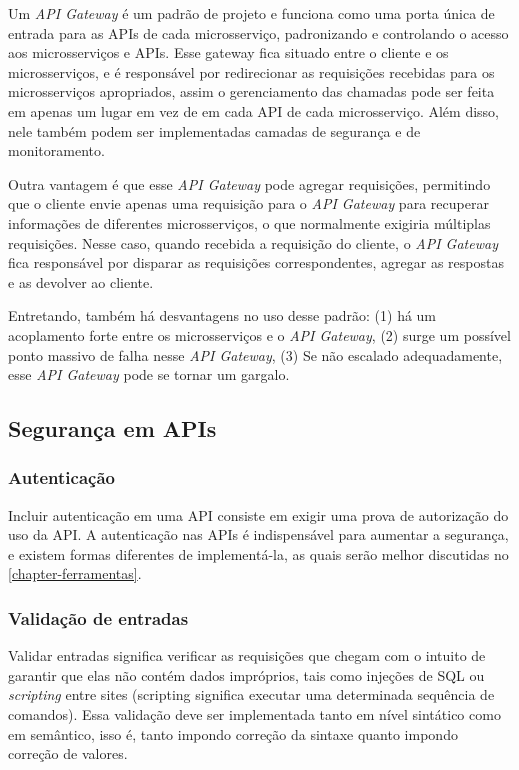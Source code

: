 Um \emph{API Gateway} é um padrão de projeto e funciona como uma porta única de entrada para as APIs de cada microsserviço, padronizando e controlando o acesso aos microsserviços e APIs. Esse gateway fica situado entre o cliente e os microsserviços, e é responsável por redirecionar as requisições recebidas para os microsserviços apropriados, assim o gerenciamento das chamadas pode ser feita em apenas um lugar em vez de em cada API de cada microsserviço. Além disso, nele também podem ser implementadas camadas de segurança e de monitoramento.

Outra vantagem é que esse \emph{API Gateway} pode agregar requisições, permitindo que o cliente envie apenas uma requisição para o \emph{API Gateway} para recuperar informações de diferentes microsserviços, o que normalmente exigiria múltiplas requisições. Nesse caso, quando recebida a requisição do cliente, o \emph{API Gateway} fica responsável por disparar as requisições correspondentes, agregar as respostas e as devolver ao cliente.

Entretando, também há desvantagens no uso desse padrão: (1) há um acoplamento forte entre os microsserviços e o \emph{API Gateway}, (2) surge um possível ponto massivo de falha nesse \emph{API Gateway}, (3) Se não escalado adequadamente, esse \emph{API Gateway} pode se tornar um gargalo. \cite{microsoft-api-gateway}

\subsection{Segurança em APIs}

\subsubsection*{Autenticação}

Incluir autenticação em uma API consiste em exigir uma prova de autorização do uso da API. A autenticação nas APIs é indispensável para aumentar a segurança, e existem formas diferentes de implementá-la, as quais serão melhor discutidas no \autoref{chapter-ferramentas}.

\subsubsection*{Validação de entradas}

Validar entradas significa verificar as requisições que chegam com o intuito de garantir que elas não contém dados impróprios, tais como injeções de SQL ou \emph{scripting} entre sites (scripting significa executar uma determinada sequência de comandos). Essa validação deve ser implementada tanto em nível sintático como em semântico, isso é, tanto impondo correção da sintaxe quanto impondo correção de valores. \cite{rapidAPI-twitter}

